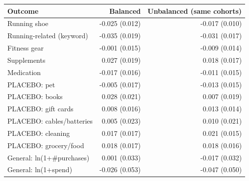 \begin{tabular}{lrr}
\toprule
Outcome & Balanced & Unbalanced (same cohorts) \\
\midrule
Running shoe & -0.025 (0.012) & -0.017 (0.010) \\
Running-related (keyword) & -0.035 (0.019) & -0.031 (0.017) \\
Fitness gear & -0.001 (0.015) & -0.009 (0.014) \\
Supplements & 0.027 (0.019) & 0.018 (0.017) \\
Medication & -0.017 (0.016) & -0.011 (0.015) \\
PLACEBO: pet & -0.005 (0.017) & -0.013 (0.015) \\
PLACEBO: books & 0.028 (0.021) & 0.007 (0.019) \\
PLACEBO: gift cards & 0.008 (0.016) & 0.013 (0.014) \\
PLACEBO: cables/batteries & 0.005 (0.023) & 0.010 (0.021) \\
PLACEBO: cleaning & 0.017 (0.017) & 0.021 (0.015) \\
PLACEBO: grocery/food & 0.018 (0.017) & 0.018 (0.016) \\
General: ln(1+\#purchases) & 0.001 (0.033) & -0.017 (0.032) \\
General: ln(1+spend) & -0.026 (0.053) & -0.047 (0.050) \\
\bottomrule
\end{tabular}
